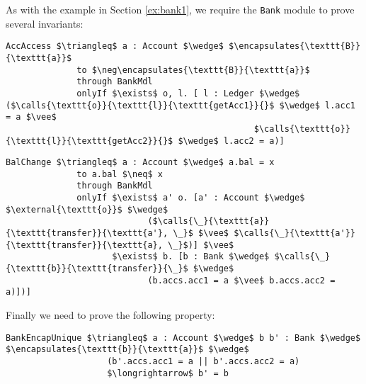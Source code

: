 \documentclass[acmsmall,review,anonymous]{acmart}\settopmatter{printfolios=true,printccs=false,printacmref=false}
\begin{document}
As with the example in Section \ref{ex:bank1}, we require 
the \verb|Bank| module to prove several invariants:
\begin{lstlisting}[language = Chainmail, mathescape=true, frame=lines]
AccAccess $\triangleq$ a : Account $\wedge$ $\encapsulates{\texttt{B}}{\texttt{a}}$
              to $\neg\encapsulates{\texttt{B}}{\texttt{a}}$
              through BankMdl
              onlyIf $\exists$ o, l. [ l : Ledger $\wedge$ ($\calls{\texttt{o}}{\texttt{l}}{\texttt{getAcc1}}{}$ $\wedge$ l.acc1 = a $\vee$ 
                                                 $\calls{\texttt{o}}{\texttt{l}}{\texttt{getAcc2}}{}$ $\wedge$ l.acc2 = a)]
\end{lstlisting}
\begin{lstlisting}[language = Chainmail, mathescape=true, frame=lines]
BalChange $\triangleq$ a : Account $\wedge$ a.bal = x
              to a.bal $\neq$ x
              through BankMdl
              onlyIf $\exists$ a' o. [a' : Account $\wedge$ $\external{\texttt{o}}$ $\wedge$ 
                            ($\calls{\_}{\texttt{a}}{\texttt{transfer}}{\texttt{a'}, \_}$ $\vee$ $\calls{\_}{\texttt{a'}}{\texttt{transfer}}{\texttt{a}, \_}$)] $\vee$
                     $\exists$ b. [b : Bank $\wedge$ $\calls{\_}{\texttt{b}}{\texttt{transfer}}{\_}$ $\wedge$ 
                            (b.accs.acc1 = a $\vee$ b.accs.acc2 = a)])]
\end{lstlisting}
Finally we need to prove the following property:
\begin{lstlisting}[language = Chainmail, mathescape=true, frame=lines]
BankEncapUnique $\triangleq$ a : Account $\wedge$ b b' : Bank $\wedge$ $\encapsulates{\texttt{b}}{\texttt{a}}$ $\wedge$
                    (b'.accs.acc1 = a || b'.accs.acc2 = a)
                    $\longrightarrow$ b' = b
\end{lstlisting}
\end{document}
